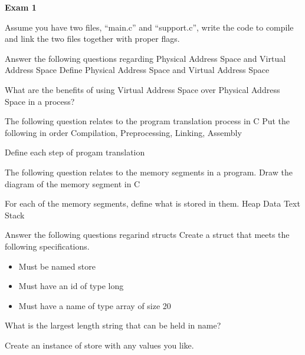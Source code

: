 \documentclass[12pt,letterpaper]{article}
\begin{document}
\textbf{\Large Exam 1}

\begin{outline}[enumerate]

\1 Assume you have two files, ``main.c'' and ``support.c'', write the code to compile and link the two
files together with proper flags.

\vspace{40mm}

\1 Answer the following questions regarding Physical Address Space and Virtual Address Space
    \2 Define Physical Address Space and Virtual Address Space

\vspace{40mm}

    \2 What are the benefits of using Virtual Address Space over Physical Address Space in a process?

\vspace{40mm}

\1 The following question relates to the program translation process in C
    \2 Put the following in order Compilation, Preprocessing, Linking, Assembly

\vspace{40mm}

    \2 Define each step of progam translation

\vspace{40mm}

\1 The following question relates to the memory segments in a program.
    \2 Draw the diagram of the memory segment in C

\vspace{40mm}

    \2 For each of the memory segments, define what is stored in them.
        \3 Heap \underline{\hspace{50mm}}
        \3 Data \underline{\hspace{50mm}}
        \3 Text \underline{\hspace{50mm}}
        \3 Stack \underline{\hspace{50mm}}

\1 Answer the following questions regarind structs
    \2 Create a struct that meets the following specifications.
        \begin{itemize}
            \item Must be named store
            \item Must have an id of type long
            \item Must have a name of type array of size 20
        \end{itemize}

\vspace{40mm}
    
    \2 What is the largest length string that can be held in name?

\vspace{40mm}

    \2 Create an instance of store with any values you like.

\vspace{40mm}
\end{outline}
\end{document}
